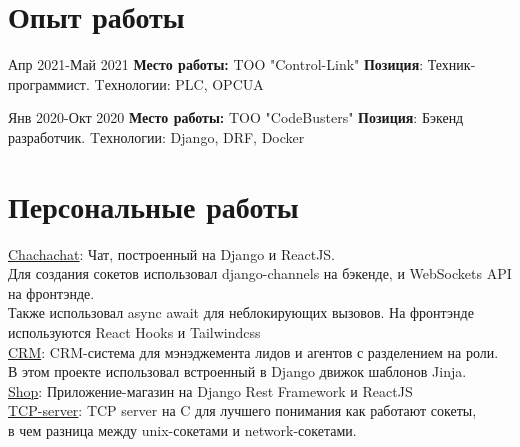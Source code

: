 \documentclass[10pt]{article} %
\begin{document}
\section{Опыт работы}

\job
{Апр 2021-}{Май 2021}
{\textbf{Место работы: }TOO "Control-Link" }
{\textbf{Позиция}: Техник-программист. Tехнологии: PLC, OPCUA}

\job
{Янв 2020-}{Окт 2020}
{\textbf{Место работы: }TOO "CodeBusters" }
{\textbf{Позиция}: Бэкенд разработчик. Tехнологии: Django, DRF, Docker}




\section{Персональные работы}


\href{https://github.com/kuator/chachachat}{Chachachat}: Чат, построенный на Django и ReactJS. \\
Для создания сокетов использовал django-channels на бэкенде, и WebSockets API на фронтэнде.\\
Также использовал async await для неблокирующих вызовов. На фронтэнде используются React Hooks и Tailwindcss\\

\href{https://github.com/kuator/customer-relations-management}{CRM}: CRM-система для мэнэджемента лидов и агентов с разделением на роли.\\
В этом проекте использовал встроенный в Django движок шаблонов Jinja. \\

\href{https://github.com/kuator/shop}{Shop}: Приложение-магазин на Django Rest Framework и ReactJS\\

\href{https://github.com/kuator/tcp-server}{TCP-server}: TCP server на C для лучшего понимания как работают сокеты,\\
в чем разница между unix-сокетами и network-сокетами.\\
\end{document}
